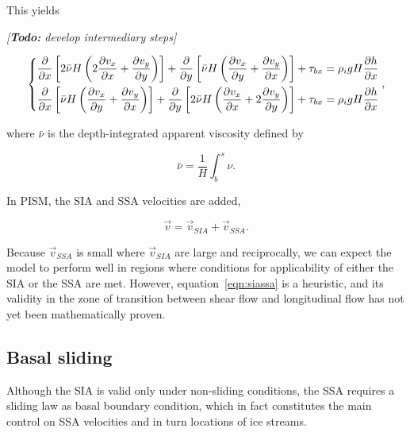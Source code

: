 \documentclass{article}
\newcommand{\todo}[1]{\emph{[\textbf{Todo:} #1]}}
\begin{document}
This yields

\todo{develop intermediary steps}

\begin{equation}
    \left\{\begin{aligned}
        \pdv{x} \left[2\bar{\nu}H
                      \left(2\pdv{v_x}{x} + \pdv{v_y}{y}\right) \right]
            + \pdv{y} \left[\bar{\nu}H
                            \left(\pdv{v_x}{y} + \pdv{v_y}{x}\right) \right]
            + \tau_{bx} &= \rho_i gH \pdv{h}{x} \\
        \pdv{x} \left[\bar{\nu}H
                      \left(\pdv{v_x}{y} + \pdv{v_y}{x}\right) \right]
            + \pdv{y} \left[2\bar{\nu}H
                            \left(\pdv{v_x}{x} + 2\pdv{v_y}{y}\right) \right]
            + \tau_{bx} &= \rho_i gH \pdv{h}{x} \\
    \end{aligned}\right.,
\end{equation}

where $\bar{\nu}$ is the depth-integrated apparent viscosity defined by

\begin{equation}
    \bar{\nu} = \frac{1}{H}\int_b^s\nu.
\end{equation}

In PISM, the SIA and SSA velocities are added,

\begin{equation}
    \label{eqn:siassa}
    \vec{v} = \vec{v}_{SIA} + \vec{v}_{SSA}.
\end{equation}

Because $\vec{v}_{SSA}$ is small where $\vec{v}_{SIA}$ are large and
reciprocally, we can expect the model to perform well in regions where
conditions for applicability of either the SIA or the SSA are met. However,
equation~\ref{eqn:siassa} is a heuristic, and its validity in the zone of
transition between shear flow and longitudinal flow has not yet been
mathematically proven.

\subsection{Basal sliding}

Although the SIA is valid only under non-sliding conditions, the SSA requires
a sliding law as basal boundary condition, which in fact constitutes the main
control on SSA velocities and in turn locations of ice streams.
\end{document}

